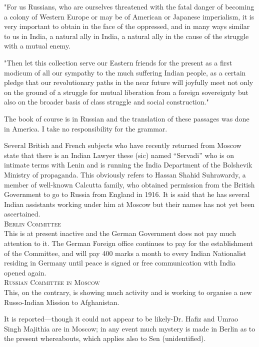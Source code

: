 "For us Russians, who are ourselves threatened with the fatal danger of becoming a colony of Western Europe or may be of American or Japanese imperialism, it is very important to obtain in the face of the oppressed, and in many ways similar to us in India, a natural ally in India, a natural ally in the cause of the struggle with a mutual enemy. 

"Then let this collection serve our Eastern friends for the present as a first modicum of all our sympathy to the much suffering Indian people, as a certain pledge that our revolutionary paths in the near future will joyfully meet not only on the ground of a struggle for mutual liberation from a foreign sovereignty but also on the broader basis of class struggle and social construction." 

The book of course is in Russian and the translation of these passages was done in America. I take no responsibility for the grammar. 

Several British and French subjects who have recently returned from Moscow state that there is an Indian Lawyer these (sic) named “Servadi” who is on intimate terms with Lenin and is running the India Department of the Bolshevik Ministry of propaganda. This obviously refers to Hassan Shahid Suhrawardy, a member of well-known Calcutta family, who obtained permission from the British Government to go to Russia from England in 1916. It is said that he has several Indian assistants working under him at Moscow but their names has not yet been ascertained. \\

\textsc{Berlin Committee}\\ 

This is at present inactive and the German Government does not pay much attention to it. The German Foreign office continues to pay for the establishment of the Committee, and will pay 400 marks a month to every Indian Nationalist residing in Germany until peace is signed or free communication with India opened again. \\

\textsc{Russian Committee in Moscow}\\ 

This, on the contrary, is showing much activity and is working to organise a new Russo-Indian Mission to Afghanistan. 

It is reported—though it could not appear to be likely-Dr. Hafiz and Umrao Singh Majithia are in Moscow; in any event much mystery is made in Berlin as to the present whereabouts, which applies also to Sen (unidentified). 

